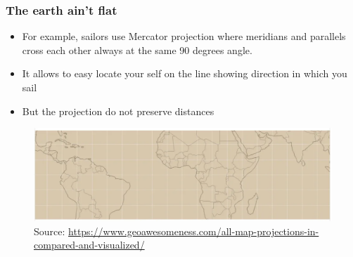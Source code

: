 \documentclass[
  shownotes,
  xcolor={svgnames},
  hyperref={colorlinks,citecolor=DarkBlue,linkcolor=DarkRed,urlcolor=DarkBlue}
  ]{beamer}
\begin{document}
\begin{frame}[fragile]
\frametitle{The earth ain't flat}
\begin{itemize}
	\footnotesize
	\item For example, sailors use Mercator projection where meridians and parallels cross each other always at the same 90 degrees angle.
	\medskip
	\item It allows to easy locate your self on the line showing direction in which you sail
	\medskip
	\item But the projection do not preserve  distances
\end{itemize}
 

\begin{figure}[H] \centering
            \captionsetup{justification=centering}
				\includegraphics[scale=0.3]{figures/Mercator}
				\\
				\tiny
				Source: \url{https://www.geoawesomeness.com/all-map-projections-in-compared-and-visualized/}
 \end{figure}


\end{frame}
\end{document}
